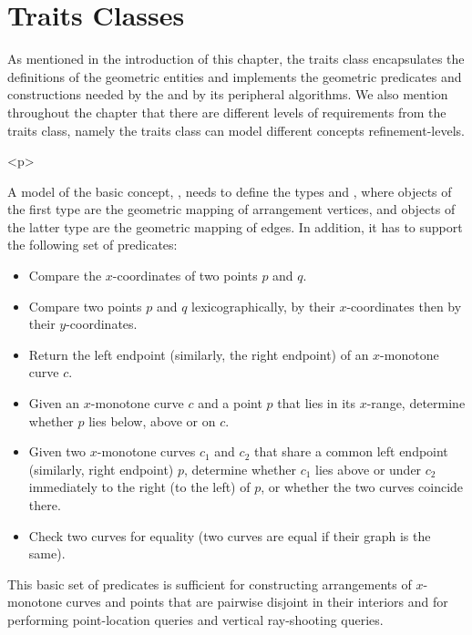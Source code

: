 
\section{Traits Classes}
\label{arr_sec:traits}
%
As mentioned in the introduction of this chapter, the traits class
encapsulates the definitions of the geometric entities and
implements the geometric predicates and constructions needed by
the  and by its peripheral algorithms. We also
mention throughout the chapter that there are different levels of
requirements from the traits class, namely the traits class can model
different concepts refinement-levels.

\begin{ccHtmlOnly}<p>\end{ccHtmlOnly}
A model of the basic concept, ,
needs to define the types  and
, where objects of the first type are
the geometric mapping of arrangement vertices, and objects of the
latter type are the geometric mapping of edges. In addition, it has to
support the following set of predicates:
\begin{itemize}
\item Compare the $x$-coordinates of two points $p$ and $q$.
\item Compare two points $p$ and $q$ lexicographically, by their
$x$-coordinates then by their $y$-coordinates.
\item Return the left endpoint (similarly, the right endpoint) of
an $x$-monotone curve $c$.
\item Given an $x$-monotone curve $c$ and a point $p$ that lies in its
$x$-range, determine whether $p$ lies below, above or on $c$.
\item Given two $x$-monotone curves $c_1$ and $c_2$ that share a
common left endpoint (similarly, right endpoint) $p$, determine
whether $c_1$ lies above or under $c_2$ immediately to the right
(to the left) of $p$, or whether the two curves coincide there.
\item Check two curves for equality (two curves are equal if their
graph is the same).
\end{itemize}
This basic set of predicates is sufficient for constructing
arrangements of $x$-monotone curves and points that are pairwise
disjoint in their interiors and for performing point-location
queries and vertical ray-shooting queries.

